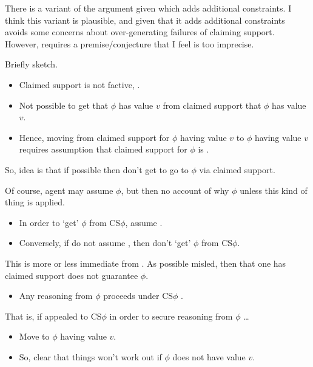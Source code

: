 \begin{note}
  There is a variant of the argument given which adds additional constraints.
  I think this variant is plausible, and given that it adds additional constraints avoids some concerns about \nI{} over-generating failures of claiming support.
  However, requires a premise/conjecture that I feel is too imprecise.

  Briefly sketch.
\end{note}

\begin{note}
  \begin{itemize}
  \item Claimed support is not factive, \nfcs{}.
  \item Not possible to get that \(\phi\) has value \(v\) from claimed support that \(\phi\) has value \(v\).
  \item Hence, moving from claimed support for \(\phi\) having value \(v\) to \(\phi\) having value \(v\) requires assumption that claimed support for \(\phi\) is \nmom{}.
  \end{itemize}

  So, idea is that if possible \mom{} then don't get to go to \(\phi\) via claimed support.

  Of course, agent may assume \(\phi\), but then no account of why \(\phi\) unless this kind of thing is applied.

  \begin{itemize}
  \item In order to `get' \(\phi\) from CS\(\phi\), assume \nmom{}.
  \item Conversely, if do not assume \nmom{}, then don't `get' \(\phi\) from CS\(\phi\).
  \end{itemize}
  This is more or less immediate from \nfcs{}.
  As possible misled, then that one has claimed support does not guarantee \(\phi\).

  \begin{itemize}
  \item Any reasoning from \(\phi\) proceeds under CS\(\phi\) \nmom{}.
  \end{itemize}

  That is, if appealed to CS\(\phi\) in order to secure reasoning from \(\phi\) \dots
\end{note}

\begin{note}
  \begin{itemize}
  \item Move to \(\phi\) having value \(v\).
  \item So, clear that things won't work out if \(\phi\) does not have value \(v\).
  \end{itemize}
\end{note}

